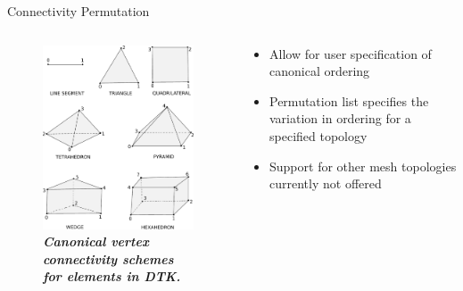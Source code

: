 \documentclass{beamer}
\begin{document}
\begin{frame}{Connectivity Permutation}

  \begin{columns}
    
    \begin{column}{0.5\textwidth}
      \begin{figure}[htpb!]
        \centering
        \includegraphics[width=2.5in]{Linear_Elements.pdf}
        \caption{\bf \sl Canonical vertex connectivity schemes for elements
          in DTK.}
        \label{fig:linear_elements}
      \end{figure}
    \end{column}

    \begin{column}{0.5\textwidth}
      \begin{itemize}
        \item Allow for user specification of canonical ordering
          \medskip
        \item Permutation list specifies the variation in ordering for
          a specified topology
          \medskip
        \item Support for other mesh topologies currently not offered
      \end{itemize}
    \end{column}

  \end{columns}


\end{frame}
\end{document}
